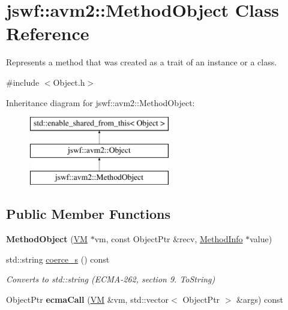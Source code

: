 \hypertarget{classjswf_1_1avm2_1_1_method_object}{\section{jswf\+:\+:avm2\+:\+:Method\+Object Class Reference}
\label{classjswf_1_1avm2_1_1_method_object}
}


Represents a method that was created as a trait of an instance or a class.  




{\ttfamily \#include $<$Object.\+h$>$}

Inheritance diagram for jswf\+:\+:avm2\+:\+:Method\+Object\+:\begin{figure}[H]
\begin{center}
\leavevmode
\includegraphics[height=3.000000cm]{classjswf_1_1avm2_1_1_method_object}
\end{center}
\end{figure}
\subsection*{Public Member Functions}
\begin{DoxyCompactItemize}
\item 
\hypertarget{classjswf_1_1avm2_1_1_method_object_aaed0d33e8acaa53786d16df44b97e8af}{{\bfseries Method\+Object} (\hyperlink{classjswf_1_1avm2_1_1_v_m}{V\+M} $\ast$vm, const Object\+Ptr \&recv, \hyperlink{structjswf_1_1avm2_1_1_method_info}{Method\+Info} $\ast$value)}\label{classjswf_1_1avm2_1_1_method_object_aaed0d33e8acaa53786d16df44b97e8af}

\item 
std\+::string \hyperlink{classjswf_1_1avm2_1_1_method_object_a166c823f400cdc125e21794f31d25d3d}{coerce\+\_\+s} () const 
\begin{DoxyCompactList}\small\item\em Converts to {\ttfamily std\+::string} (E\+C\+M\+A-\/262, section 9. {\itshape To\+String}) \end{DoxyCompactList}\item 
\hypertarget{classjswf_1_1avm2_1_1_method_object_ab4985a2c40310dca67ad070ab9b3aefa}{Object\+Ptr {\bfseries ecma\+Call} (\hyperlink{classjswf_1_1avm2_1_1_v_m}{V\+M} \&vm, std\+::vector$<$ Object\+Ptr $>$ \&args) const }\label{classjswf_1_1avm2_1_1_method_object_ab4985a2c40310dca67ad070ab9b3aefa}

\end{DoxyCompactItemize}
